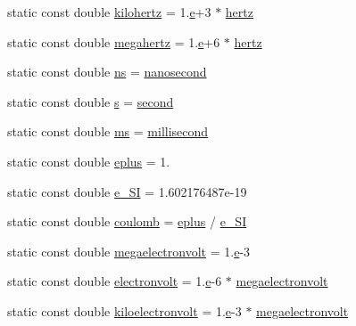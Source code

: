\begin{DoxyCompactItemize}
static const double \hyperlink{namespacedd4hep_a047776833f7632dfbfa1b7e4aa17ffd0}{kilohertz} = 1.\hyperlink{_volumes_8cpp_a8a9a1f93e9b09afccaec215310e64142}{e}+3 $\ast$ \hyperlink{namespacedd4hep_a5ada76b9ea37d13e1e346f2256017cff}{hertz}
\item 
static const double \hyperlink{namespacedd4hep_a67e1a0f3e5d536a61c5b88820e284f6e}{megahertz} = 1.\hyperlink{_volumes_8cpp_a8a9a1f93e9b09afccaec215310e64142}{e}+6 $\ast$ \hyperlink{namespacedd4hep_a5ada76b9ea37d13e1e346f2256017cff}{hertz}
\item 
static const double \hyperlink{namespacedd4hep_af8ce9b988119cb2c9b6b7397dbb34e97}{ns} = \hyperlink{namespacedd4hep_acd3d49e76b85c03111a8bdcaffe4c8c7}{nanosecond}
\item 
static const double \hyperlink{namespacedd4hep_a016f64f3a4662ba41ea7f04ba2d59ef5}{s} = \hyperlink{namespacedd4hep_ac03364576705a245265d8ed6ea26b871}{second}
\item 
static const double \hyperlink{namespacedd4hep_a75a019cb4a909458c79262a2a401662a}{ms} = \hyperlink{namespacedd4hep_ac5b763830694c4ae41e03dc174f1cc79}{millisecond}
\item 
static const double \hyperlink{namespacedd4hep_a96ccff254b6dcebf179c3630f6205857}{eplus} = 1.
\item 
static const double \hyperlink{namespacedd4hep_a18365e1a8b0f1730924219e336e11e9f}{e\+\_\+\+SI} = 1.\+602176487e-\/19
\item 
static const double \hyperlink{namespacedd4hep_a399f2340c615066766d822ce9c9781b7}{coulomb} = \hyperlink{namespacedd4hep_a96ccff254b6dcebf179c3630f6205857}{eplus} / \hyperlink{namespacedd4hep_a18365e1a8b0f1730924219e336e11e9f}{e\+\_\+\+SI}
\item 
static const double \hyperlink{namespacedd4hep_a4e39beba039f7a6bda24a7031c121b2a}{megaelectronvolt} = 1.\hyperlink{_volumes_8cpp_a8a9a1f93e9b09afccaec215310e64142}{e}-\/3
\item 
static const double \hyperlink{namespacedd4hep_a849fe8dd27af5a22a8d7891687a4d499}{electronvolt} = 1.\hyperlink{_volumes_8cpp_a8a9a1f93e9b09afccaec215310e64142}{e}-\/6 $\ast$ \hyperlink{namespacedd4hep_a4e39beba039f7a6bda24a7031c121b2a}{megaelectronvolt}
\item 
static const double \hyperlink{namespacedd4hep_a05014d49c7c5438820adf620633249e7}{kiloelectronvolt} = 1.\hyperlink{_volumes_8cpp_a8a9a1f93e9b09afccaec215310e64142}{e}-\/3 $\ast$ \hyperlink{namespacedd4hep_a4e39beba039f7a6bda24a7031c121b2a}{megaelectronvolt}
\item 

\end{DoxyCompactItemize}

